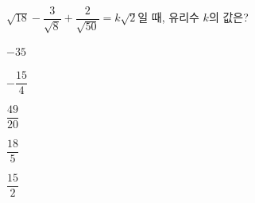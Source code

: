 $\sqrt{18}-\dfrac{3}{\sqrt{8}}+\dfrac{2}{\sqrt{50}}=k\sqrt{2}$일 때, 유리수 $k$의 값은?
\begin{choices32}{\rule[-3ex]{0pt}{8ex}$-35$}{\rule[-3ex]{0pt}{8ex}$-\dfrac{15}{4}$}{\rule[-3ex]{0pt}{8ex}$\dfrac{49}{20}$}{\rule[-3ex]{0pt}{8ex}$\dfrac{18}{5}$}{\rule[-3ex]{0pt}{8ex}$\dfrac{15}{2}$}\end{choices32}

